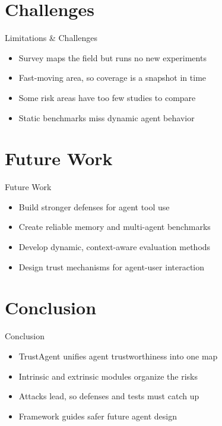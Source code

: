 \documentclass[10pt]{beamer}
\begin{document}
\section{Challenges}
\begin{frame}{Limitations \& Challenges}
\begin{itemize}
  \item Survey maps the field but runs no new experiments
  \item Fast-moving area, so coverage is a snapshot in time
  \item Some risk areas have too few studies to compare
  \item Static benchmarks miss dynamic agent behavior
\end{itemize}
\end{frame}

\section{Future Work}
\begin{frame}{Future Work}
\begin{itemize}
  \item Build stronger defenses for agent tool use
  \item Create reliable memory and multi-agent benchmarks
  \item Develop dynamic, context-aware evaluation methods
  \item Design trust mechanisms for agent-user interaction
\end{itemize}
\end{frame}

\section{Conclusion}
\begin{frame}{Conclusion}
\begin{itemize}
  \item TrustAgent unifies agent trustworthiness into one map
  \item Intrinsic and extrinsic modules organize the risks
  \item Attacks lead, so defenses and tests must catch up
  \item Framework guides safer future agent design
\end{itemize}
\end{frame}
\end{document}
